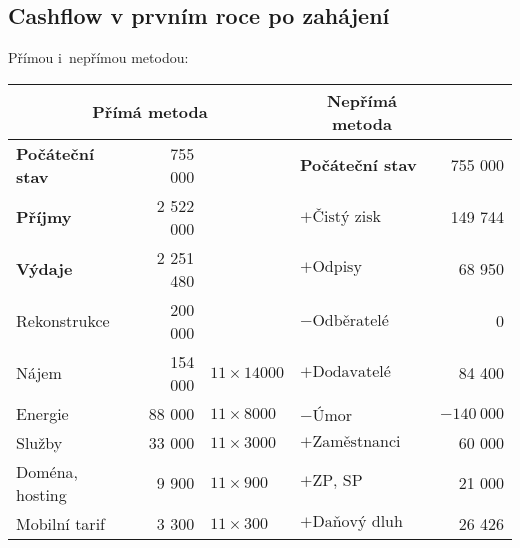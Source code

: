 \newpage

\subsection{Cashflow v prvním roce po zahájení}
Přímou i~nepřímou metodou:

\begin{table}[htbp]
\begin{center}
\begin{tabular}{lrllr}
\multicolumn{3}{c}{\textbf{Přímá metoda}}                               & \multicolumn{1}{c}{\textbf{Nepřímá metoda}} &                          \\ \hline
\textbf{Počáteční stav}                    & 755 000            &                   & \textbf{Počáteční stav}                           & 755 000            \\
\textbf{Příjmy}                            & 2 522 000          &                   & $+\text{Čistý zisk}$                              & 149 744            \\
\textbf{Výdaje}                            & 2 251 480          &                   & $+\text{Odpisy}$                                  & 68 950             \\
\hspace{0,5cm}Rekonstrukce                 & 200 000            &                   & $-\text{Odběratelé}$                              & 0                  \\
\hspace{0,5cm}Nájem                        & 154 000            & $11 \times 14000$ & $+\text{Dodavatelé}$                              & 84 400             \\
\hspace{0,5cm}Energie                      & 88 000             & $11 \times 8000$  & $-\text{Úmor}$                                    & $-140~000$         \\
\hspace{0,5cm}Služby                       & 33 000             & $11 \times 3000$  & $+\text{Zaměstnanci}$                             & 60 000             \\
\hspace{0,5cm}Doména, hosting              & 9 900              & $11 \times 900$   & $+\text{ZP, SP}$                                  & 21 000             \\
\hspace{0,5cm}Mobilní tarif                & 3 300              & $11 \times 300$   & $+\text{Daňový dluh}$                             & 26 426             \\

\end{tabular}
\end{center}
\end{table}
